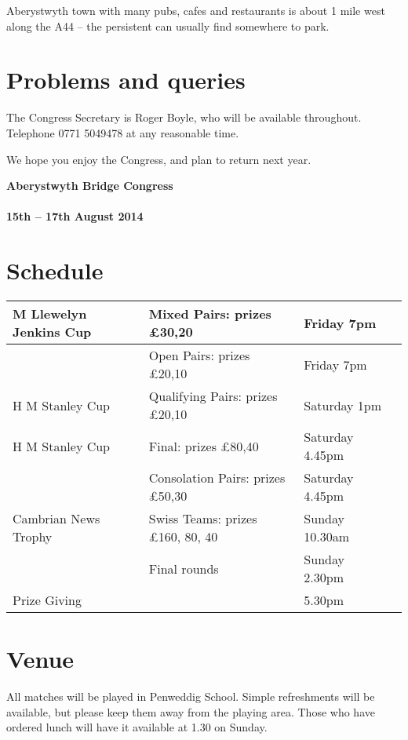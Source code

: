 \documentclass[12pt]{article}
\begin{document}
Aberystwyth town with many pubs, cafes and restaurants is about 1
mile west along the A44 -- the persistent can usually find somewhere to
park.

\section{Problems and queries}

The Congress Secretary is Roger Boyle, who will be available
throughout.
Telephone 0771 5049478 at any reasonable time.

We hope you enjoy the Congress, and plan to return next year.

\newpage
\setcounter{section}{0}

{\bf {\Large Aberystwyth Bridge Congress}}\\
\ \\
{\bf {\large 15th -- 17th August 2014}}

\section{Schedule}
\begin{center}
\begin{tabular}{|| l | l | l | l ||}
	\hline
	\hline
	M Llewelyn Jenkins Cup &
	Mixed Pairs:
	prizes \pounds 30,20 &
	Friday 7pm \\
	\hline
	&
	Open Pairs:
	prizes \pounds 20,10 &
	Friday 7pm \\
	\hline
	\hline
	H M Stanley Cup &
	Qualifying Pairs:
	prizes \pounds 20,10 &
	Saturday 1pm \\
	\hline
	H M Stanley Cup &
	Final:
	prizes \pounds 80,40 &
	Saturday 4.45pm \\
	\hline
	&
	Consolation Pairs:
	prizes \pounds 50,30 &
	Saturday 4.45pm \\
	\hline
	\hline
	Cambrian News Trophy &
	Swiss Teams:
	prizes \pounds 160, 80, 40 &
	Sunday 10.30am \\
	\hline
	&
	Final rounds &
	Sunday 2.30pm \\
	\hline
	Prize Giving & & 5.30pm\\
	\hline
	\hline
\end{tabular}
\end{center}

\section{Venue}

All matches will be played in Penweddig School.
Simple refreshments will be available, but please keep them away from
the playing area.
Those who have ordered lunch will have it available at 1.30 on Sunday.
\end{document}
